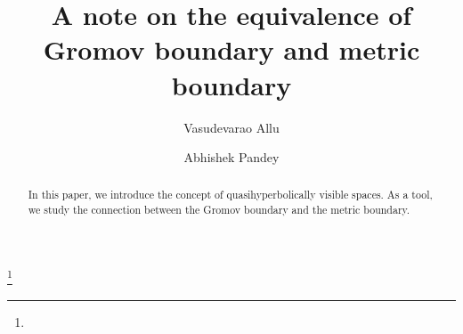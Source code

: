 \documentclass[a4paper,12pt]{amsart}
\theoremstyle{definition}
\newcounter{minutes}\setcounter{minutes}{\time}
\newcounter{hours}\setcounter{hours}{\time}
\begin{document}
	
	\title{A note on the equivalence of Gromov boundary and metric boundary}
	
	\author{Vasudevarao Allu}
	\address{Vasudevarao Allu,
		Department of Mathematics,
		School of Basic Sciences,
		Indian Institute of Technology  Bhubaneswar,
		Argul, Bhubaneswar, PIN-752050, Odisha (State),  India.}
	
	
	\author{Abhishek Pandey}
	\address{Abhishek Pandey,
		Department of Mathematics,
		School of Basic Sciences,
		Indian Institute of Technology  Bhubaneswar,
		Argul, Bhubaneswar, PIN-752050, Odisha (State),  India.}
	
	\makeatletter
	\makeatother
	
	
	
	
	
	\def\thefootnote{}
	 \makeatletter\def\thefootnote{\@arabic\c@footnote}\makeatother
	
	
	
	
	
	\thanks{}
	
	
	
	
	
	\begin{abstract}
		In this paper, we introduce the concept of quasihyperbolically visible spaces. As a tool, we study the connection between the Gromov boundary and the metric boundary.
	\end{abstract}
	
	\maketitle
	\pagestyle{myheadings}
	
	
\end{document}
